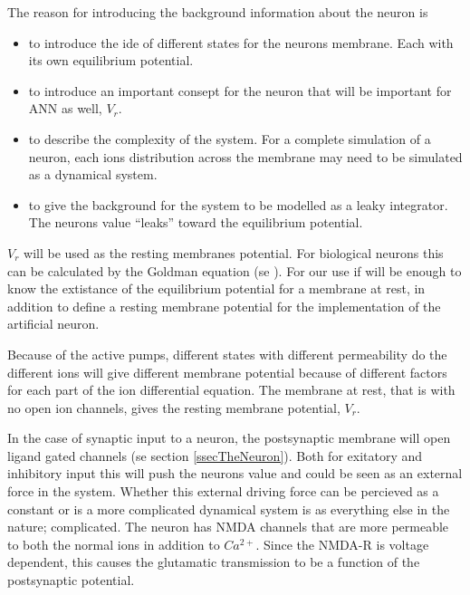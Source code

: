 

The reason for introducing the background information about the neuron is 
\begin{itemize}
	\item to introduce the ide of different states for the neurons membrane. Each with its own equilibrium potential.
	\item to introduce an important consept for the neuron that will be important for ANN as well, $V_{r}$.
	\item to describe the complexity of the system. For a complete simulation of a neuron, each ions distribution across the membrane may need to be simulated as a dynamical system.
	\item to give the background for the system to be modelled as a leaky integrator. The neurons value ``leaks'' toward the equilibrium potential.
\end{itemize}

$V_{r}$ will be used as the resting membranes potential. For biological neurons this can be calculated by the Goldman equation (se \cite{PrinciplesOfNeuralScience4edKAP07}). 
For our use if will be enough to know the extistance of the equilibrium potential for a membrane at rest,
in addition to define a resting membrane potential for the implementation of the artificial neuron.





Because of the active pumps, different states with different permeability do the different ions will give different membrane potential because of different factors for each part of the ion differential equation. 
The membrane at rest, that is with no open ion channels, gives the resting membrane potential, $V_r$. 

In the case of synaptic input to a neuron, the postsynaptic membrane will open ligand gated channels (se section \ref{ssecTheNeuron}). 
Both for exitatory and inhibitory input this will push the neurons value and could be seen as an external force in the system.
Whether this external driving force can be percieved as a constant or is a more complicated dynamical system is as everything else in the nature; complicated. %
The neuron has NMDA channels that are more permeable to both the normal ions in addition to $Ca^{2+}$. Since the NMDA-R is voltage dependent, this causes the glutamatic transmission to be a function of the postsynaptic potential.

